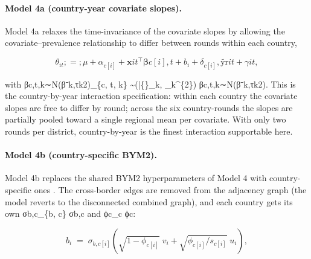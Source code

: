 \documentclass{article}
\begin{document}
\paragraph{Model 4a (country-year covariate slopes).}

Model 4a relaxes the time-invariance of the covariate slopes by allowing
the covariate--prevalence relationship to differ between rounds within
each country,

\begin{equation}

\theta_{it} ;=; \mu + \alpha_{c[i]} + \mathbf{x}{it}^{\top} \bm{\beta}{c[i], t} + b_i + \delta_{c[i]} , \widetilde{\text{yr}}{it} + \gamma{it},

\label{eq:m4a}

\end{equation}

with βc,t,k∼N(βˉk,τk2)\beta\_\{c, t, k\}
\sim {}(\bar\{\beta\}\_k, \tau\_k\^{}\{2\})
βc,t,k\hspace{0pt}∼N(βˉ\hspace{0pt}k\hspace{0pt},τk2\hspace{0pt}). This
is the country-by-year interaction specification: within each country
the covariate slopes are free to differ by round; across the six
country-rounds the slopes are partially pooled toward a single regional
mean per covariate. With only two rounds per district, country-by-year
is the finest interaction supportable here.

\paragraph{Model 4b (country-specific BYM2).}

Model 4b replaces the shared BYM2 hyperparameters of Model 4 with
country-specific ones \citep{donegan2021}. The cross-border edges are
removed from the adjacency graph (the model reverts to the disconnected
combined graph), and each country gets its own σb,c\sigma\_\{b, c\}
σb,c\hspace{0pt} and ϕc\phi\_c ϕc\hspace{0pt}:

\begin{equation}

b_i \;=\; \sigma_{b, c[i]} \left( \sqrt{1 - \phi_{c[i]}} \; v_i + \sqrt{\phi_{c[i]} / s_{c[i]}} \; u_i \right),

\label{eq:m4b}

\end{equation}
\end{document}
